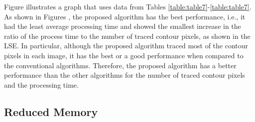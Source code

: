 
Figure  illustrates a graph that uses data from Tables \ref{table:table7}-\ref{table:table7}. As shown in Figures , the proposed algorithm has the best performance, i.e., it had the least average processing time and showed the smallest increase in the ratio of the process time to the number of traced contour pixels, as shown in the LSE. In particular, although the proposed algorithm traced most of the contour pixels in each image, it has the best or a good performance when compared to the conventional algorithms. Therefore, the proposed algorithm has a better performance than the other algorithms for the number of traced contour pixels and the processing time. 


\subsection{Reduced Memory}

